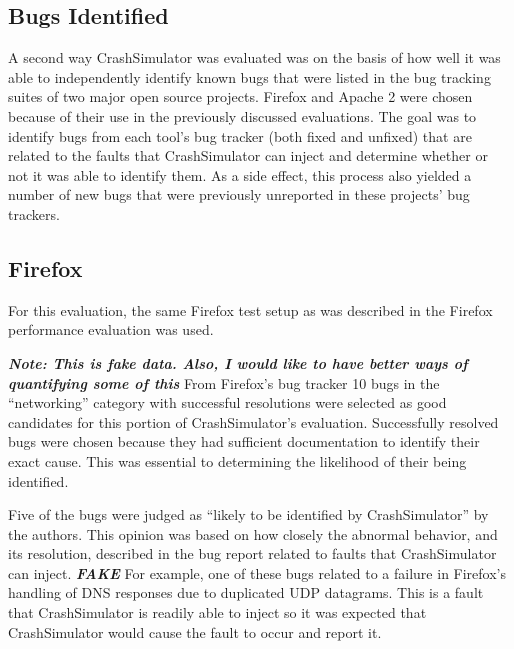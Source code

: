     \subsection{Bugs Identified}

        A second way CrashSimulator was evaluated was on the basis of how well it was able to independently identify
        known bugs that were listed in the bug tracking suites of two major open source projects. Firefox and Apache 2
        were chosen because of their use in the previously discussed evaluations. The goal was to identify bugs from
        each tool's bug tracker (both fixed and unfixed) that are related to the faults that CrashSimulator can inject
        and determine whether or not it was able to identify them. As a side effect, this process also yielded a number
        of new bugs that were previously unreported in these projects' bug trackers.

        \subsection{Firefox}

            For this evaluation, the same Firefox test setup as was described in the Firefox performance evaluation was
            used.

            \textbf{\emph{Note: This is fake data. Also, I would like to have better ways of quantifying some of this}}
            From Firefox's bug tracker 10 bugs in the ``networking'' category with successful resolutions were selected
            as good candidates for this portion of CrashSimulator's evaluation. Successfully resolved bugs were chosen
            because they had sufficient documentation to identify their exact cause. This was essential to determining
            the likelihood of their being identified.

            Five of the bugs were judged as ``likely to be identified by CrashSimulator'' by the authors. This opinion
            was based on how closely the abnormal behavior, and its resolution, described in the bug report related to
            faults that CrashSimulator can inject. \textbf{\emph{FAKE}} For example, one of these bugs related to a
            failure in Firefox's handling of DNS responses due to duplicated UDP datagrams. This is a fault that
            CrashSimulator is readily able to inject so it was expected that CrashSimulator would cause the fault to
            occur and report it.


